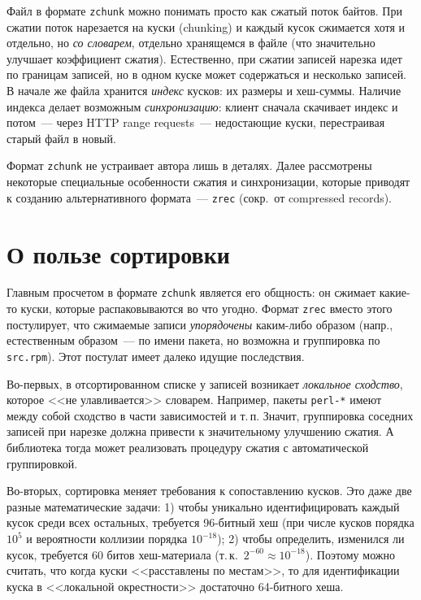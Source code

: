 \documentclass[russian,a4paper,12pt]{article}
\begin{document}
Файл в формате \verb|zchunk| можно понимать просто как сжатый поток байтов.  При сжатии поток нарезается на куски (chunking)
и каждый кусок сжимается хотя и отдельно, но \textit{со словарем}, отдельно хранящемся в файле (что значительно улучшает
коэффициент сжатия).  Естественно, при сжатии записей нарезка идет по границам записей, но в одном куске может содержаться
и несколько записей.  В начале же файла хранится \textit{индекс} кусков: их размеры и хеш-суммы.  Наличие индекса делает
возможным \textit{синхронизацию}: клиент сначала скачивает индекс и потом~--- через HTTP range requests~--- недостающие
куски, перестраивая старый файл в новый.

Формат \verb|zchunk| не устраивает автора лишь в деталях.  Далее рассмотрены некоторые специальные особенности сжатия
и синхронизации, которые приводят к созданию альтернативного формата~--- \verb|zrec| (сокр.~от compressed records).

\section{О пользе сортировки}
Главным просчетом в формате \verb|zchunk| является его общность: он сжимает какие-то куски, которые распаковываются
во что угодно.  Формат \verb|zrec| вместо этого постулирует, что сжимаемые записи \textit{упорядочены} каким-либо образом
(напр., естественным образом~--- по имени пакета, но возможна и группировка по \verb|src.rpm|).
Этот постулат имеет далеко идущие последствия.

Во-первых, в отсортированном списке у записей возникает \textit{локальное сходство}, которое <<не улавливается>> словарем.
Например, пакеты \verb|perl-*| имеют между собой сходство в части зависимостей и т.\,п.  Значит, группировка соседних
записей при нарезке должна привести к значительному улучшению сжатия.  А библиотека тогда может реализовать
процедуру сжатия с автоматической группировкой.

Во-вторых, сортировка меняет требования к сопоставлению кусков.  Это даже две разные математические задачи:
1) чтобы уникально идентифицировать каждый кусок среди всех остальных, требуется 96-битный хеш (при числе кусков порядка $10^5$
и вероятности коллизии порядка $10^{-18}$); 2) чтобы определить, изменился ли кусок, требуется 60 битов хеш-материала
(т.\,к.~$2^{-60}\approx10^{-18}$).  Поэтому можно считать, что когда куски <<расставлены по местам>>, то для идентификации
куска в <<локальной окрестности>> достаточно 64-битного хеша.
\end{document}
